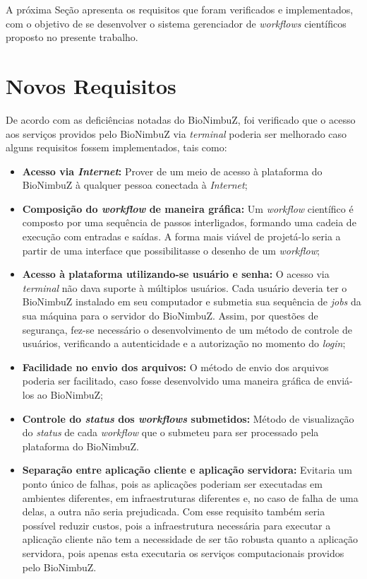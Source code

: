 A próxima Seção apresenta os requisitos que foram verificados e implementados, com o objetivo de se desenvolver o sistema gerenciador de \textit{workflows} científicos proposto no presente trabalho.

\section{Novos Requisitos} \label{cap5sec2}

De acordo com as deficiências notadas do BioNimbuZ, foi verificado que o acesso aos serviços providos pelo BioNimbuZ via \textit{terminal} poderia ser melhorado caso alguns requisitos fossem implementados, tais como:

\begin{itemize}
	\item \textbf{Acesso via \textit{Internet}:} Prover de um meio de acesso à plataforma do BioNimbuZ à qualquer pessoa conectada à \textit{Internet};
    \item \textbf{Composição do \textit{workflow} de maneira gráfica:} Um \textit{workflow} científico é composto por uma sequência de passos interligados, formando uma cadeia de execução com entradas e saídas. A forma mais viável de projetá-lo seria a partir de uma interface que possibilitasse o desenho de um \textit{workflow};
	\item \textbf{Acesso à plataforma utilizando-se usuário e senha:} O acesso via \textit{terminal} não dava suporte à múltiplos usuários. Cada usuário deveria ter o BioNimbuZ instalado em seu computador e submetia sua sequência de \textit{jobs} da sua máquina para o servidor do BioNimbuZ. Assim, por questões de segurança, fez-se necessário o desenvolvimento de um método de controle de usuários, verificando a autenticidade e a autorização no momento do \textit{login};
    \item \textbf{Facilidade no envio dos arquivos:} O método de envio dos arquivos poderia ser facilitado, caso fosse desenvolvido uma maneira gráfica de enviá-los ao BioNimbuZ;
    \item \textbf{Controle do \textit{status} dos \textit{workflows} submetidos:} Método de visualização do \textit{status} de cada \textit{workflow} que o submeteu para ser processado pela plataforma do BioNimbuZ.
    \item \textbf{Separação entre aplicação cliente e aplicação servidora:} Evitaria um ponto único de falhas, pois as aplicações poderiam ser executadas em ambientes diferentes, em infraestruturas diferentes e, no caso de falha de uma delas, a outra não seria prejudicada. Com esse requisito também seria possível reduzir custos, pois a infraestrutura necessária para executar a aplicação cliente não tem a necessidade de ser tão robusta quanto a aplicação servidora, pois apenas esta executaria os serviços computacionais providos pelo BioNimbuZ.
\end{itemize}

